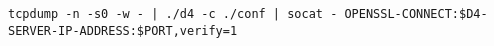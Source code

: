 \begin{lstlisting}
tcpdump -n -s0 -w - | ./d4 -c ./conf | socat - OPENSSL-CONNECT:$D4-SERVER-IP-ADDRESS:$PORT,verify=1
\end{lstlisting}
